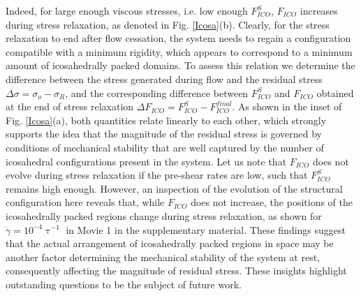 \documentclass[%
preprint,
 amsmath,amssymb,
 aps,
]{revtex4-1}
\begin{document}
{{Indeed, for large enough viscous stresses, i.e. low enough $F_{ICO}^{S}$, $F_{ICO}$ increases during stress relaxation, as denoted in Fig. \ref{Icosa}(b). Clearly, for the stress relaxation to end after flow cessation, the system needs to regain a configuration compatible with a minimum rigidity, which appears to correspond to a minimum amount of icosahedrally packed domains. 
To assess this relation we determine the difference between the stress generated during flow and the residual stress $\Delta \sigma = \sigma_o - \sigma_R$, and the corresponding difference between $F_{ICO}^{S}$ and $F_{ICO}$ obtained at the end of stress relaxation $\Delta F_{ICO} = F_{ICO}^{S} - F_{ICO}^{final}$. As shown in the inset of Fig. \ref{Icosa}(a), both quantities relate linearly to each other, which strongly supports the idea that the magnitude of the residual stress is governed by conditions of mechanical stability that are well captured by the number of icosahedral configurations present in the system. Let us note that $F_{ICO}$ does not evolve during stress relaxation if the pre-shear rates are low, such that $F_{ICO}^S$ remains high enough. However, an inspection of the evolution of the structural configuration here reveals that, while $F_{ICO}$ does not increase, the positions of the icosahedrally packed regions change during stress relaxation, as shown for $\dot{\gamma} = 10^{-4} \uptau^{-1}$ in Movie 1 in the supplementary material. These findings suggest that the actual arrangement of icosahedrally packed regions in space may be another factor determining the mechanical stability of the system at rest, consequently affecting the magnitude of residual stress. These insights highlight outstanding questions to be the subject of future work.     




}}
\end{document}
